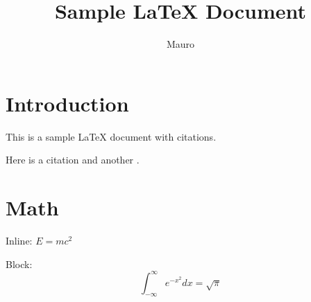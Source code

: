 \documentclass{article}
\title{Sample LaTeX Document}
\author{Mauro}
\begin{document}
\maketitle

\section{Introduction}

This is a sample LaTeX document with citations.

Here is a citation \cite{smith2020} and another \cite{doe2018}.

\section{Math}

Inline: $E = mc^2$

Block:
\[
\int_{-\infty}^{\infty} e^{-x^2} dx = \sqrt{\pi}
\]
\end{document}
